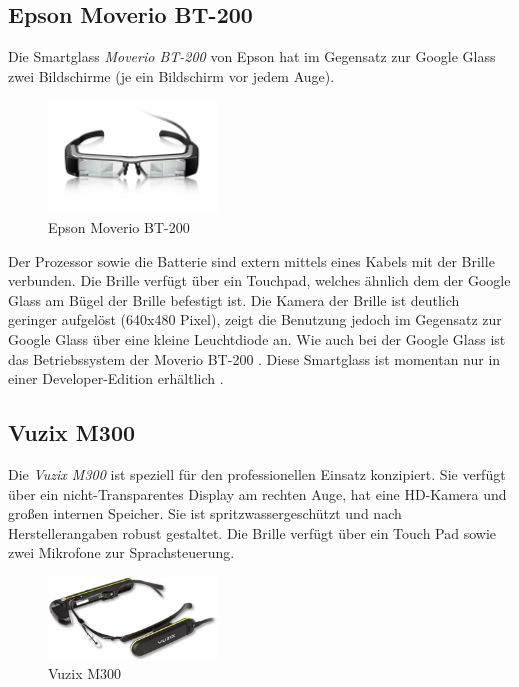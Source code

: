 \subsection{Epson Moverio BT-200}
\label{sec:Epson_Moverio_BT-200}
Die Smartglass \emph{Moverio BT-200} von Epson hat im Gegensatz zur Google Glass zwei Bildschirme (je ein Bildschirm vor jedem Auge). 
%
\begin{figure}[htbp]
    \centering
    \includegraphics[width=0.4\textwidth]{data/bilder/Moverio_BT-200.png}
    \caption{Epson Moverio BT-200 \cite{Epson}}
    \label{fig:BT-200}
\end{figure}
%
Der Prozessor sowie die Batterie sind extern mittels eines Kabels mit der Brille verbunden. Die Brille verfügt über ein Touchpad, welches ähnlich dem der Google Glass am Bügel der Brille befestigt ist. Die Kamera der Brille ist deutlich geringer aufgelöst (640x480 Pixel), zeigt die Benutzung jedoch im Gegensatz zur Google Glass über eine kleine Leuchtdiode an. Wie auch bei der Google Glass ist das Betriebssystem der Moverio BT-200 \cite[S.~32]{Schwenke2016}. Diese Smartglass ist momentan nur in einer Developer-Edition erhältlich \cite{Epson}.
%
%
%
%
%
%
\subsection{Vuzix M300}
\label{sec:Vuzix_M300}
Die \emph{Vuzix M300} ist speziell für den professionellen Einsatz konzipiert. Sie verfügt über ein nicht-Transparentes Display am rechten Auge, hat eine HD-Kamera und großen internen Speicher. Sie ist spritzwassergeschützt und nach Herstellerangaben robust gestaltet. Die Brille verfügt über ein Touch Pad sowie zwei Mikrofone zur Sprachsteuerung. 
%
\begin{figure}[htbp]
    \centering
    \includegraphics[width=0.4\textwidth]{data/bilder/m300-top.png}
    \caption{Vuzix M300 \cite{Vuzix2018}}
    \label{fig:Vuzix_M300}
\end{figure}
%

